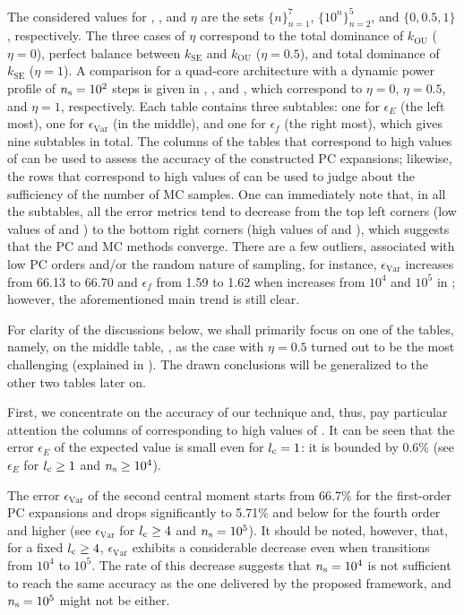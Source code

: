 The considered values for \lc, \ns, and $\eta$ are the sets $\{ n \}_{n = 1}^7$,
$\{ 10^n \}_{n = 2}^5$, and $\{ 0, 0.5, 1 \}$, respectively. The three cases of
$\eta$ correspond to the total dominance of $k_\mathrm{OU}$ ($\eta = 0$),
perfect balance between $k_\mathrm{SE}$ and $k_\mathrm{OU}$ ($\eta = 0.5$), and
total dominance of $k_\mathrm{SE}$ ($\eta = 1$). A comparison for a quad-core
architecture with a dynamic power profile of ${n_\mathrm{s}} = 10^2$ steps is given in
, , and , which
correspond to $\eta = 0$, $\eta = 0.5$, and $\eta = 1$, respectively. Each table
contains three subtables: one for $\epsilon_E$ (the left most), one for
$\epsilon_\mathrm{Var}$
(in the middle), and one for $\epsilon_f$ (the right most), which gives nine
subtables in total. The columns of the tables that correspond to high values of
\ns can be used to assess the accuracy of the constructed PC expansions;
likewise, the rows that correspond to high values of \lc can be used to judge
about the sufficiency of the number of MC samples. One can immediately note
that, in all the subtables, all the error metrics tend to decrease from the top
left corners (low values of \lc and \ns) to the bottom right corners (high
values of \lc and \ns), which suggests that the PC and MC methods converge.
There are a few outliers, associated with low PC orders and/or the random nature
of sampling, for instance, $\epsilon_\mathrm{Var}$ increases from 66.13 to 66.70 and
$\epsilon_f$ from 1.59 to 1.62 when \ns increases from $10^4$ and $10^5$ in
; however, the aforementioned main trend is still clear.

For clarity of the discussions below, we shall primarily focus on one of the
tables, namely, on the middle table, , as the case with
$\eta = 0.5$ turned out to be the most challenging (explained in
). The drawn conclusions will be generalized to the other two
tables later on.

First, we concentrate on the accuracy of our technique and, thus, pay particular
attention the columns of  corresponding to high values of
\ns. It can be seen that the error $\epsilon_E$ of the expected value is small
even for ${l_\mathrm{c}} = 1$: it is bounded by 0.6\% (see $\epsilon_E$ for ${l_\mathrm{c}} \geq 1$
and ${n_\mathrm{s}} \geq 10^4$).

The error $\epsilon_\mathrm{Var}$ of the second central moment starts from
66.7\% for the first-order PC expansions and drops significantly to 5.71\% and
below for the fourth order and higher (see $\epsilon_\mathrm{Var}$ for ${l_\mathrm{c}} \geq
4$ and ${n_\mathrm{s}} = 10^5$). It should be noted, however, that, for a fixed ${l_\mathrm{c}} \geq
4$, $\epsilon_\mathrm{Var}$ exhibits a considerable decrease even when \ns
transitions from $10^4$ to $10^5$. The rate of this decrease suggests that ${n_\mathrm{s}}
= 10^4$ is not sufficient to reach the same accuracy as the one delivered by the
proposed framework, and ${n_\mathrm{s}} = 10^5$ might not be either.

